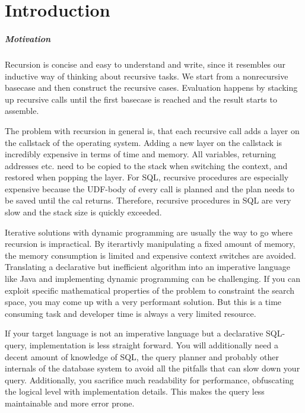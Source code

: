 \chapter{Introduction}\label{Introduction}


\paragraph*{Motivation} Recursion is concise and easy to understand and write, since it resembles our inductive way of thinking about recursive tasks. We start from a nonrecursive basecase and then construct the recursive cases. Evaluation happens by stacking up recursive calls until the first basecase is reached and the result starts to assemble.

The problem with recursion in general is, that each recursive call adds a layer on the callstack of the operating system. Adding a new layer on the callstack is incredibly expensive in terms of time and memory. All variables, returning addresses etc. need to be copied to the stack when switching the context, and restored when popping the layer. For SQL, recursive procedures are especially expensive because the UDF-body of every call is planned and the plan needs to be saved until the cal returns. Therefore, recursive procedures in SQL are very slow and the stack size is quickly exceeded.

Iterative solutions with dynamic programming are usually the way to go where recursion is impractical. By iterartivly manipulating a fixed amount of memory, the memory consumption is limited and expensive context switches are avoided. Translating a declarative but inefficient algorithm into an imperative language like Java and implementing dynamic programming can be challenging. If you can exploit specific mathematical properties of the problem to constraint the search space, you may come up with a very performant solution. But this is a time consuming task and developer time is always a very limited resource.

If your target language is not an imperative language but a declarative SQL-query, implementation is less straight forward. You will additionally need a decent amount of knowledge of SQL, the query planner and probably other internals of the database system to avoid all the pitfalls that can slow down your query. Additionally, you sacrifice much readability for performance, obfuscating the logical level with implementation details. This makes the query less maintainable and more error prone.


